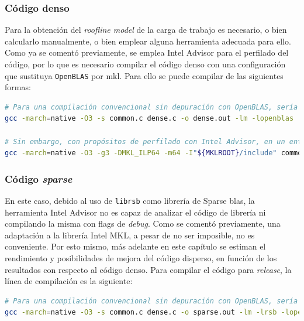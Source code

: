 \subsubsection{Código denso}
Para la obtención del \textit{roofline model} de la carga de trabajo es necesario, o bien calcularlo manualmente, o bien emplear alguna herramienta adecuada para ello. Como ya se comentó previamente, se emplea Intel Advisor para el perfilado del código, por lo que es necesario compilar el código denso con una configuración que sustituya \texttt{OpenBLAS} por \acrshort{mkl}. Para ello se puede compilar de las siguientes formas:\medskip
\begin{lstlisting}[language=bash]
# Para una compilación convencional sin depuración con OpenBLAS, sería necesario únicamente ejecutar
gcc -march=native -O3 -s common.c dense.c -o dense.out -lm -lopenblas

# Sin embargo, con propósitos de perfilado con Intel Advisor, en un entorno bash donde se haya realizado `source /opt/intel/oneapi/setvar.sh` se ha de compilar con:
gcc -march=native -O3 -g3 -DMKL_ILP64 -m64 -I"${MKLROOT}/include" common.c dense.c -o dense.out -L${MKLROOT}/lib/intel64 -Wl,--no-as-needed -lmkl_intel_ilp64 -lmkl_gnu_thread -lmkl_core -lgomp -lpthread -lm -ldl
\end{lstlisting}

\subsubsection{Código \textit{sparse}}
En este caso, debido al uso de \texttt{librsb} como librería de Sparse \acrshort{blas}, la herramienta Intel Advisor no es capaz de analizar el código de librería ni compilando la misma con flags de \textit{debug}. Como se comentó previamente, una adaptación a la librería Intel MKL, a pesar de no ser imposible, no es conveniente. Por esto mismo, más adelante en este capítulo se estiman el rendimiento y posibilidades de mejora del código disperso, en función de los resultados con respecto al código denso. Para compilar el código para \textit{release}, la línea de compilación es la siguiente:\medskip
\begin{lstlisting}[language=bash]
# Para una compilación convencional sin depuración con OpenBLAS, sería necesario únicamente compilar con:
gcc -march=native -O3 -s common.c dense.c -o sparse.out -lm -lrsb -lopenblas
\end{lstlisting}

